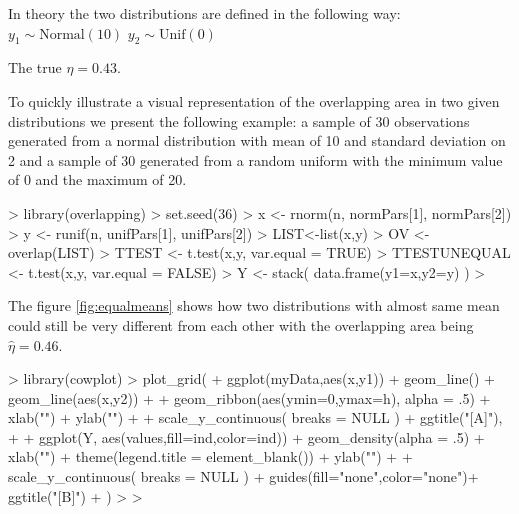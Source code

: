 \documentclass[twocolumn]{article}
\begin{document}
\vspace{.3cm}

In theory the two distributions are defined in the following way: 
$y_1 \sim \text{Normal}(10)$ 
$y_2 \sim \text{Unif}(0)$  

The true $\eta = 0.43$.


\vspace{.3cm}
To quickly illustrate a visual representation of the overlapping area in two given distributions we present the following example: a sample of 30 observations generated from a normal distribution with mean of 10 and standard deviation on 2 and a sample of 30 generated from a random uniform with the minimum value of 0 and the maximum of 20.



\begin{Schunk}
\begin{Sinput}
> library(overlapping)
> set.seed(36)
> x <- rnorm(n, normPars[1], normPars[2])
> y <- runif(n, unifPars[1], unifPars[2])
> LIST<-list(x,y)
> OV <- overlap(LIST)
> TTEST <- t.test(x,y, var.equal = TRUE)
> TTESTUNEQUAL <- t.test(x,y, var.equal = FALSE)
> Y <- stack( data.frame(y1=x,y2=y) )
> 
\end{Sinput}
\end{Schunk}

The figure \ref{fig:equalmeans} shows how two distributions with almost same mean could still be very different from each other with the overlapping area being $\hat{\eta} = 0.46$. 


\begin{Schunk}
\end{Schunk}

\begin{Schunk}
\begin{Sinput}
> library(cowplot)
> plot_grid(
+   ggplot(myData,aes(x,y1)) + geom_line() + geom_line(aes(x,y2)) + 
+     geom_ribbon(aes(ymin=0,ymax=h), alpha = .5) + xlab("") + ylab("") + 
+     scale_y_continuous( breaks = NULL ) + ggtitle("[A]"), 
+   
+   ggplot(Y, aes(values,fill=ind,color=ind)) + geom_density(alpha = .5) + xlab("") + theme(legend.title = element_blank()) + ylab("") + 
+     scale_y_continuous( breaks = NULL ) + guides(fill="none",color="none")+ ggtitle("[B]")
+ )
> 
> 
\end{Sinput}
\end{Schunk}
\end{document}

